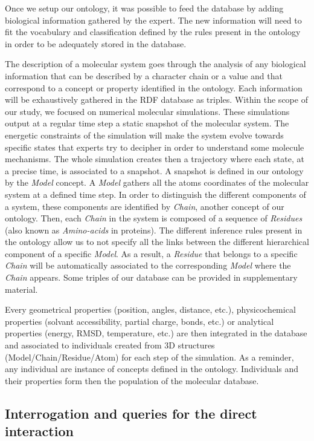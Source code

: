 \documentclass{vgtc}                          %
\begin{document}
Once we setup our ontology, it was possible to feed the database by adding biological information gathered by the expert. The new information will need to fit the vocabulary and classification defined by the rules present in the ontology in order to be adequately stored in the database.

The description of a molecular system goes through the analysis of any biological information that can be described by a character chain or a value and that correspond to a concept or property identified in the ontology. Each information will be exhaustively gathered in the RDF database as triples. Within the scope of our study, we focused on numerical molecular simulations. These simulations output at a regular time step a static snapshot of the molecular system. The energetic constraints of the simulation will make the system evolve towards specific states that experts try to decipher in order to understand some molecule mechanisms. The whole simulation creates then a trajectory where each state, at a precise time, is associated to a snapshot. A snapshot is defined in our ontology by the \textit{Model} concept. A \textit{Model} gathers all the atoms coordinates of the molecular system at a defined time step. In order to distinguish the different components of a system, these components are identified by \textit{Chain}, another concept of our ontology. Then, each \textit{Chain} in the system is composed of a sequence of \textit{Residues} (also known as \textit{Amino-acids} in proteins). The different inference rules present in the ontology allow us to not specify all the links between the different hierarchical component of a specific \textit{Model}. As a result, a \textit{Residue} that belongs to a specific \textit{Chain} will be automatically associated to the corresponding \textit{Model} where the \textit{Chain} appears.
Some triples of our database can be provided in supplementary material.

Every geometrical properties (position, angles, distance, etc.), physicochemical properties (solvant accessibility, partial charge, bonds, etc.) or analytical properties (energy, RMSD, temperature, etc.) are then integrated in the database and associated to individuals created from 3D structures (Model/Chain/Residue/Atom) for each step of the simulation. As a reminder, any individual are instance of concepts defined in the ontology. Individuals and their properties form then the population of the molecular database.

\subsection{Interrogation and queries for the direct interaction}
\end{document}
